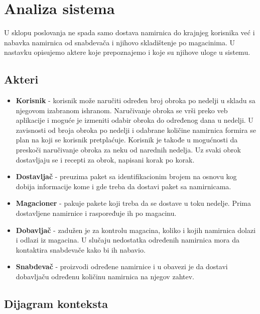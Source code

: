 
\section{Analiza sistema}

	U sklopu poslovanja ne spada samo dostava namirnica do krajnjeg korisnika već i nabavka namirnica od snabdevača i njihovo skladištenje po magacinima. U nastavku opisujemo aktere koje prepoznajemo i koje su njihove uloge u sistemu.
\subsection{Akteri}
	\begin{itemize}
		\item{\textbf{Korisnik}} - korisnik može naručiti određen broj obroka po nedelji u skladu sa njegovom izabranom ishranom. Naručivanje obroka se vrši preko veb aplikacije i moguće je izmeniti odabir obroka do određenog dana u nedelji. U zavisnosti od broja obroka po nedelji i odabrane količine namirnica formira se plan na koji se korisnik pretplaćuje. Korisnik je takođe u mogućnosti da preskoči naručivanje obroka za neku od narednih nedelja. Uz svaki obrok dostavljaju se i recepti za obrok, napisani korak po korak.
		\item{\textbf{Dostavljač}} - preuzima paket sa identifikacionim brojem na osnovu kog dobija informacije kome i gde treba da dostavi paket sa namirnicama.
		\item{\textbf{Magacioner}} - pakuje pakete koji treba da se dostave u toku nedelje. Prima dostavljene namirnice i raspoređuje ih po magacinu.
		\item{\textbf{Dobavljač}} - zadužen je za kontrolu magacina, koliko i kojih namirnica dolazi i odlazi iz magacina. U slučaju nedostatka određenih namirnica mora da kontaktira snabdevače kako bi ih nabavio.
		\item{\textbf{Snabdevač}} - proizvodi određene namirnice i u obavezi je da dostavi dobavljaču određenu količinu namirnica na njegov zahtev.
	\end{itemize}
\subsection{Dijagram konteksta}
